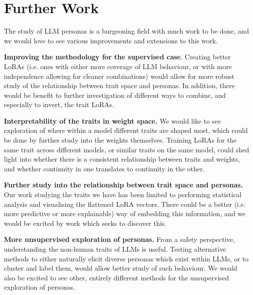 \section{Further Work}\label{sec:further-work}

The study of LLM personas is a burgeoning field with much work to be done, and we would love to see various improvements and extensions to this work.

\textbf{Improving the methodology for the supervised case}.
Creating better LoRAs (i.e.
ones with either more coverage of LLM behaviour, or with more independence allowing for cleaner combinations) would allow for more robust study of the relationship between trait space and personas.
In addition, there would be benefit to further investigation of different ways to combine, and especially to invert, the trait LoRAs.

\textbf{Interpretability of the traits in weight space.} We would like to see exploration of where within a model different traits are shaped most, which could be done by further study into the weights themselves.
Training LoRAs for the same trait across different models, or similar traits on the same model, could shed light into whether there is a consistent relationship between traits and weights, and whether continuity in one translates to continuity in the other.

\textbf{Further study into the relationship between trait space and personas.} Our work studying the traits we have has been limited to performing statistical analysis and visualising the flattened LoRA vectors.
There could be a better (i.e.
more predictive or more explainable) way of embedding this information, and we would be excited by work which seeks to discover this.

\textbf{More unsupervised exploration of personas.} From a safety perspective, understanding the non-human traits of LLMs is useful.
Testing alternative methods to either naturally elicit diverse personas which exist within LLMs, or to cluster and label them, would allow better study of such behaviour.
We would also be excited to see other, entirely different methods for the unsupervised exploration of personas.

